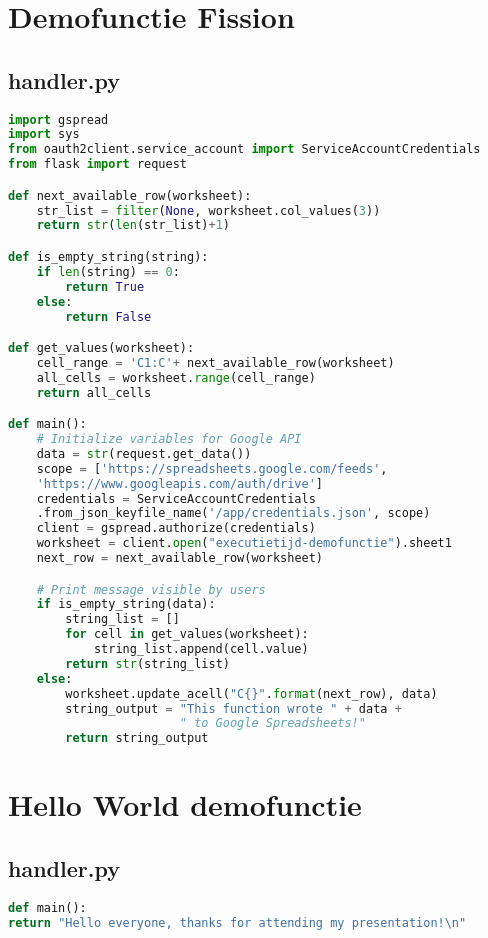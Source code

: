 \newpage
\section{Demofunctie Fission}
\subsection{handler.py}
\label{sec:demofunctie-fission}
\begin{lstlisting}[language=python]
import gspread
import sys
from oauth2client.service_account import ServiceAccountCredentials
from flask import request

def next_available_row(worksheet):
    str_list = filter(None, worksheet.col_values(3))
    return str(len(str_list)+1)

def is_empty_string(string):
    if len(string) == 0:
        return True
    else:
        return False

def get_values(worksheet):
    cell_range = 'C1:C'+ next_available_row(worksheet)
    all_cells = worksheet.range(cell_range)
    return all_cells

def main():   
    # Initialize variables for Google API
    data = str(request.get_data())
    scope = ['https://spreadsheets.google.com/feeds',
    'https://www.googleapis.com/auth/drive']
    credentials = ServiceAccountCredentials
    .from_json_keyfile_name('/app/credentials.json', scope)
    client = gspread.authorize(credentials)
    worksheet = client.open("executietijd-demofunctie").sheet1
    next_row = next_available_row(worksheet)

    # Print message visible by users
    if is_empty_string(data):
        string_list = []
        for cell in get_values(worksheet):
            string_list.append(cell.value)
        return str(string_list)
    else:
        worksheet.update_acell("C{}".format(next_row), data)
        string_output = "This function wrote " + data + 
                        " to Google Spreadsheets!"
        return string_output
\end{lstlisting}

\section{Hello World demofunctie}
\label{sec:fission-hello-world-functie}
\subsection{handler.py}
\begin{lstlisting}[language=python]
def main():
return "Hello everyone, thanks for attending my presentation!\n"
\end{lstlisting}

